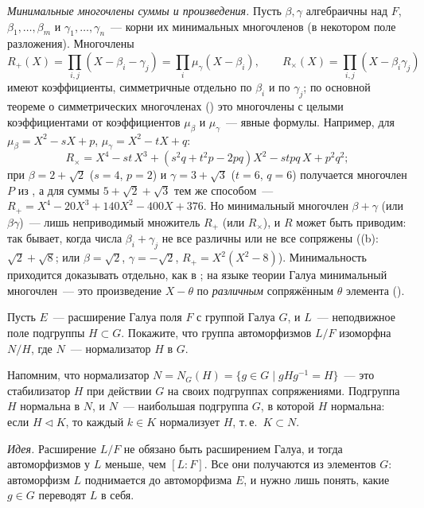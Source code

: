 \begin{aside}
\emph{Минимальные многочлены суммы и произведения.} Пусть $\beta,\gamma$ алгебраичны над $F$, $\beta_1,\dots,\beta_m$ и
$\gamma_1,\dots,\gamma_n$~--- корни их минимальных многочленов (в некотором поле разложения). Многочлены
\[
R_+(X)=\prod_{i,j}(X-\beta_i-\gamma_j)=\prod_i\mu_\gamma(X-\beta_i),\qquad R_\times(X)=\prod_{i,j}(X-\beta_i\gamma_j)
\]
имеют коэффициенты, симметричные отдельно по $\beta_i$ и по $\gamma_j$; по основной теореме о симметрических многочленах
() это многочлены с целыми коэффициентами от коэффициентов $\mu_\beta$ и $\mu_\gamma$~--- явные формулы. Например,
для $\mu_\beta=X^2-sX+p$, $\mu_\gamma=X^2-tX+q$:
\[
R_\times=X^4-st\,X^3+(s^2q+t^2p-2pq)X^2-stpq\,X+p^2q^2 ;
\]
при $\beta=2+\sqrt2$ ($s=4$, $p=2$) и $\gamma=3+\sqrt3$ ($t=6$, $q=6$) получается многочлен $P$ из , а для суммы
$5+\sqrt2+\sqrt3$ тем же способом~--- $R_+=X^4-20X^3+140X^2-400X+376$. Но минимальный многочлен $\beta+\gamma$ (или
$\beta\gamma$)~--- лишь неприводимый множитель $R_+$ (или $R_\times$), и $R$ может быть приводим: так бывает, когда числа
$\beta_i+\gamma_j$ не все различны или не все сопряжены ((b): $\sqrt2+\sqrt8$; или $\beta=\sqrt2$, $\gamma=-\sqrt2$,
$R_+=X^2(X^2-8)$). Минимальность приходится доказывать отдельно, как в ; на языке теории Галуа минимальный
многочлен~--- это произведение $X-\theta$ по \emph{различным} сопряжённым $\theta$ элемента ().
\end{aside}

\begin{exercise}[3-4]
Пусть $E$~--- расширение Галуа поля $F$ с группой Галуа $G$, и $L$~--- неподвижное поле подгруппы $H\subset G$. Покажите,
что группа автоморфизмов $L/F$ изоморфна $N/H$, где $N$~--- нормализатор $H$ в $G$.
\end{exercise}

Напомним, что нормализатор $N=N_G(H)=\{g\in G\mid gHg^{-1}=H\}$~--- это стабилизатор $H$ при действии $G$ на своих
подгруппах сопряжениями. Подгруппа $H$ нормальна в $N$, и $N$~--- наибольшая подгруппа $G$, в которой $H$ нормальна: если
$H\triangleleft K$, то каждый $k\in K$ нормализует $H$, т.\,е.\ $K\subset N$.

\medskip\noindent\emph{Идея.} Расширение $L/F$ не обязано быть расширением Галуа, и тогда автоморфизмов у $L$ меньше, чем $[L:F]$. Все
они получаются из элементов $G$: автоморфизм $L$ поднимается до автоморфизма $E$, и нужно лишь понять, какие $g\in G$
переводят $L$ в себя.

